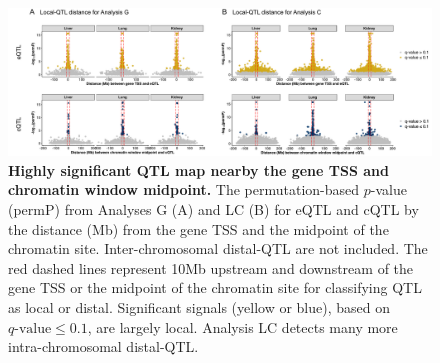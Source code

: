 \documentclass[9pt,twocolumn,twoside]{gsajnl}
\begin{document}
%
%

\begin{figure}[hp]
\renewcommand{\familydefault}{\sfdefault}\normalfont
\centering
\includegraphics[width=\textwidth]{figs/qtl_distance_all.pdf}
\caption{\textbf{Highly significant QTL map nearby the gene TSS and chromatin window midpoint.} The permutation-based $p$-value (permP) from Analyses G (A) and LC (B) for eQTL and cQTL by the distance (Mb) from the gene TSS and the midpoint of the chromatin site. Inter-chromosomal distal-QTL are not included. The red dashed lines represent 10Mb upstream and downstream of the gene TSS or the midpoint of the chromatin site for classifying QTL as local or distal. Significant signals (yellow or blue), based on $q\text{-value} \le 0.1$, are largely local. Analysis LC detects many more intra-chromosomal distal-QTL.
\label{fig:dist_all}}
\end{figure}
\end{document}
